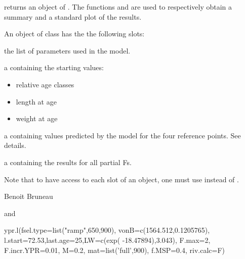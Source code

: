 \documentclass[a4paper]{book}
\begin{document}
\begin{Value}
 returns an object of  . The functions  and  are used to respectively
obtain a summary and a standard plot of the results.  

An object of class  has the the following slots:


\begin{ldescription}
\item[\code{parms}] the list of parameters used in the model.
\item[\code{base}] a  containing the starting values:
\begin{itemize}

\item relative age classes
\item length at age
\item weight at age

\end{itemize}


\item[\code{refs}] a  containing values predicted by the model for the four reference points. See details. 
\item[\code{YPR}] a  containing the results for all partial Fs.


\end{ldescription}
Note that to have access to each slot of an  object, one must use  instead of .
\end{Value}
%
\begin{Author}\relax
Benoit Bruneau
\end{Author}
%
\begin{SeeAlso}\relax
{} and   
\end{SeeAlso}
%
\begin{Examples}
\begin{ExampleCode}

ypr.l(fsel.type=list("ramp",650,900), vonB=c(1564.512,0.1205765), 
      l.start=72.53,last.age=25,LW=c(exp( -18.47894),3.043), F.max=2,
      F.incr.YPR=0.01, M=0.2, mat=list('full',900), f.MSP=0.4, riv.calc=F) 

\end{ExampleCode}
\end{Examples}
\printindex{}
\end{document}
